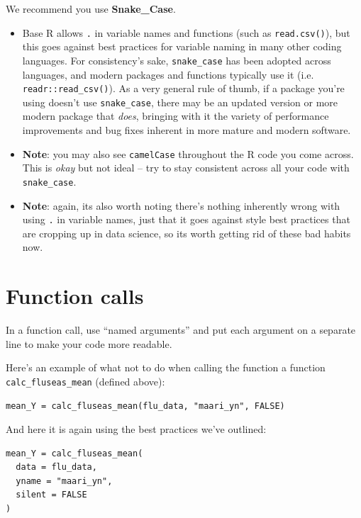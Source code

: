 \documentclass[]{book}
\begin{document}
We recommend you use \textbf{Snake\_Case}.

\begin{itemize}
\item
  Base R allows \texttt{.} in variable names and functions (such as
  \texttt{read.csv()}), but this goes against best practices for
  variable naming in many other coding languages. For consistency's
  sake, \texttt{snake\_case} has been adopted across languages, and
  modern packages and functions typically use it (i.e.
  \texttt{readr::read\_csv()}). As a very general rule of thumb, if a
  package you're using doesn't use \texttt{snake\_case}, there may be an
  updated version or more modern package that \emph{does}, bringing with
  it the variety of performance improvements and bug fixes inherent in
  more mature and modern software.
\item
  \textbf{Note}: you may also see \texttt{camelCase} throughout the R
  code you come across. This is \emph{okay} but not ideal -- try to stay
  consistent across all your code with \texttt{snake\_case}.
\item
  \textbf{Note}: again, its also worth noting there's nothing inherently
  wrong with using \texttt{.} in variable names, just that it goes
  against style best practices that are cropping up in data science, so
  its worth getting rid of these bad habits now.
\end{itemize}

\section{Function calls}\label{function-calls}

In a function call, use ``named arguments'' and put each argument on a
separate line to make your code more readable.

Here's an example of what not to do when calling the function a function
\texttt{calc\_fluseas\_mean} (defined above):

\begin{verbatim}
mean_Y = calc_fluseas_mean(flu_data, "maari_yn", FALSE)
\end{verbatim}

And here it is again using the best practices we've outlined:

\begin{verbatim}
mean_Y = calc_fluseas_mean(
  data = flu_data, 
  yname = "maari_yn",
  silent = FALSE
)
\end{verbatim}
\end{document}
